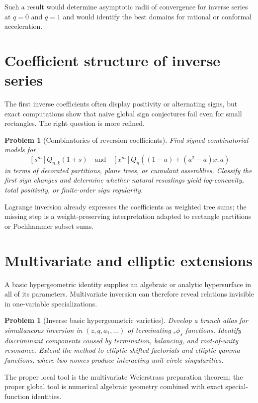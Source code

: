 \documentclass[11pt,oneside]{book}
\newtheorem{problem}[theorem]{Problem}
\theoremstyle{definition}
\theoremstyle{remark}
\begin{document}
Such a result would determine asymptotic radii of convergence for inverse
series at $q=0$ and $q=1$ and would identify the best domains for rational or
conformal acceleration.

\section{Coefficient structure of inverse series}
The first inverse coefficients often display positivity or alternating signs,
but exact computations show that naive global sign conjectures fail even for
small rectangles.  The right question is more refined.

\begin{problem}[Combinatorics of reversion coefficients]
Find signed combinatorial models for
\[
 [s^m]Q_{n,k}(1+s)
 \quad\text{and}\quad
 [x^m]Q_n((1-a)+(a^2-a)x;a)
\]
in terms of decorated partitions, plane trees, or cumulant assemblies.
Classify the first sign changes and determine whether natural rescalings yield
log-concavity, total positivity, or finite-order sign regularity.
\end{problem}

Lagrange inversion already expresses the coefficients as weighted tree sums;
the missing step is a weight-preserving interpretation adapted to rectangle
partitions or Pochhammer subset sums.

\section{Multivariate and elliptic extensions}
A basic hypergeometric identity supplies an algebraic or analytic hypersurface
in all of its parameters.  Multivariate inversion can therefore reveal
relations invisible in one-variable specializations.

\begin{problem}[Inverse basic hypergeometric varieties]
Develop a branch atlas for simultaneous inversion in $(z,q,a_1,\ldots)$ of
terminating ${}_r\phi_s$ functions.  Identify discriminant components caused
by termination, balancing, and root-of-unity resonance.  Extend the method to
elliptic shifted factorials and elliptic gamma functions, where two nomes
produce interacting unit-circle singularities.
\end{problem}

The proper local tool is the multivariate Weierstrass preparation theorem;
the proper global tool is numerical algebraic geometry combined with exact
special-function identities.
\end{document}
